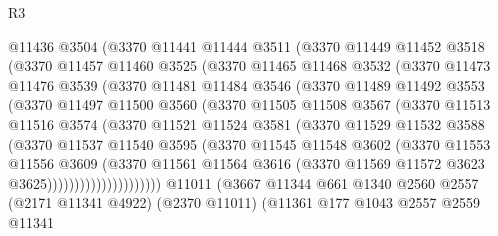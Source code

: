 \begin{lexlean}{R3}
\begin{coremodule}
            @11436
            @3504
            (@3370
              @11441
              @11444
              @3511
              (@3370
                @11449
                @11452
                @3518
                (@3370
                  @11457
                  @11460
                  @3525
                  (@3370
                    @11465
                    @11468
                    @3532
                    (@3370
                      @11473
                      @11476
                      @3539
                      (@3370
                        @11481
                        @11484
                        @3546
                        (@3370
                          @11489
                          @11492
                          @3553
                          (@3370
                            @11497
                            @11500
                            @3560
                            (@3370
                              @11505
                              @11508
                              @3567
                              (@3370
                                @11513
                                @11516
                                @3574
                                (@3370
                                  @11521
                                  @11524
                                  @3581
                                  (@3370
                                    @11529
                                    @11532
                                    @3588
                                    (@3370
                                      @11537
                                      @11540
                                      @3595
                                      (@3370
                                        @11545
                                        @11548
                                        @3602
                                        (@3370
                                          @11553
                                          @11556
                                          @3609
                                          (@3370
                                            @11561
                                            @11564
                                            @3616
                                            (@3370 @11569 @11572 @3623 @3625)))))))))))))))))))))
    @11011
    (@3667
      @11344
      @661
      @1340
      @2560
      @2557
      (@2171 @11341 @4922)
      (@2370 @11011)
      (@11361
        @177
        @1043
        @2557
        @2559
        @11341

\end{coremodule}
\end{lexlean}
